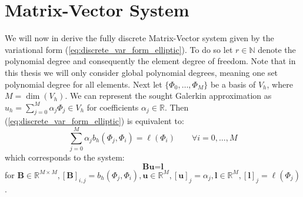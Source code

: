 \section{Matrix-Vector System}
\label{sec:matrix_vect_syst}
We will now in derive the fully discrete Matrix-Vector system given by
the variational form (\ref{eq:discrete_var_form_elliptic}). To do so let
$r \in \mathbb{N}$ denote the polynomial degree and consequently the element degree of freedom.
Note that in this thesis we will only consider global polynomial degrees, meaning one set polynomial degree for all elements.
Next let $\{\Phi_0,\ldots,\Phi_M\}$ be a basis of $V_h$, where $M = \dim(V_h)$.
We can represent the sought Galerkin approximation as $u_h = \sum_{j=0}^{M} \alpha_j \Phi_j\in V_h$ for coefficients
$\alpha_j \in \mathbb{R}$. Then (\ref{eq:discrete_var_form_elliptic}) is equivalent to:
\begin{equation*}
	\sum_{j=0}^{M} \alpha_j b_h(\Phi_j, \Phi_i) = \ell(\Phi_i) \qquad \forall i=0,\ldots,M
\end{equation*}
which corresponds to the system:
\begin{equation}
	\label{eq:fully_discrete_dg_system_elliptic}
	\textbf{Bu} = \textbf{l}
\end{equation}
for $ \textbf{B} \in \mathbb{R}^{M\times M}, [\textbf{B}]_{i,j} = b_h(\Phi_j, \Phi_i),
	\textbf{u} \in \mathbb{R}^M, [\textbf{u}]_j = \alpha_j,
	\textbf{l}\in\mathbb{R}^M, [\textbf{l}]_j = \ell(\Phi_j)$.

